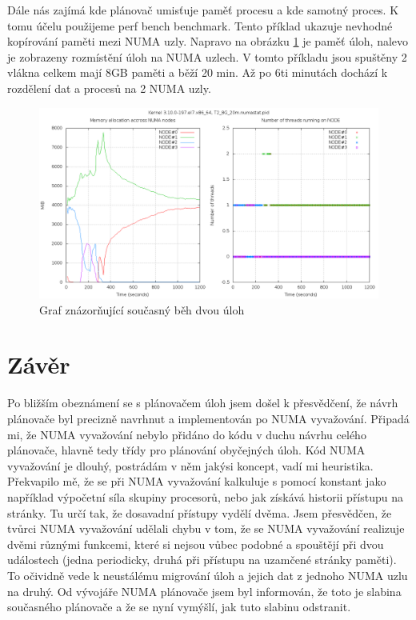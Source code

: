 \documentclass[
  master=true,
  font=sans,
  printversion=false,
  joinlists=true,
  figures=true,
  tables=true,
  sourcecodes=false,
  theorems=false,
  bibencoding=utf8,
  language=czech,
  encoding=utf8,
  field=ainfk,
  biblatex,
  glossaries,
  index
]{kidiplom}
\begin{document}
\noindent
{}
\label{PerfBenchResultExample}

\noindent
Dále nás zajímá kde plánovač umisťuje paměť procesu a kde samotný proces. K tomu účelu použijeme perf bench benchmark. Tento příklad ukazuje nevhodné kopírování paměti mezi NUMA uzly. Napravo na obrázku \ref{PerfBenchResult} je paměť úloh, nalevo je zobrazeny rozmístění úloh na NUMA uzlech. V tomto příkladu jsou spuštěny 2 vlákna celkem mají 8GB paměti a běží 20 min. Až po 6ti minutách dochází k rozdělení dat a procesů na 2 NUMA uzly. 

\begin{figure}[ht]
\includegraphics[scale=0.30]{obrazky/PerfBenchResult.png}
\caption{Graf znázorňující současný běh dvou úloh}
\label{PerfBenchResult}
\end{figure}

\section{Závěr}
Po bližším obeznámení se s plánovačem úloh jsem došel k přesvědčení, že návrh plánovače byl precizně navrhnut a implementován po NUMA vyvažování. Připadá mi, že NUMA vyvažování nebylo přidáno do kódu v duchu návrhu celého plánovače, hlavně tedy třídy pro plánování obyčejných úloh. Kód NUMA vyvažování je dlouhý, postrádám v něm jakýsi koncept, vadí mi heuristika. Překvapilo mě, že se při NUMA vyvažování kalkuluje s pomocí konstant jako například výpočetní síla skupiny procesorů, nebo jak získává historii přístupu na stránky. Tu určí tak, že dosavadní přístupy vydělí dvěma. Jsem přesvědčen, že tvůrci NUMA vyvažování udělali chybu v tom, že se NUMA vyvažování realizuje dvěmi různými funkcemi, které si nejsou vůbec podobné a spouštějí při dvou událostech (jedna periodicky, druhá při přístupu na uzamčené stránky paměti). To očividně vede k neustálému migrování úloh a jejich dat z jednoho NUMA uzlu na druhý. Od vývojáře NUMA plánovače jsem byl informován, že toto je slabina současného plánovače a že se nyní vymýšlí, jak tuto slabinu odstranit. 
\end{document}
